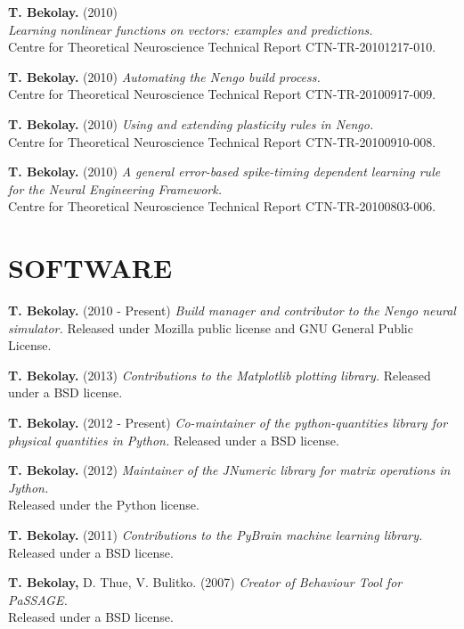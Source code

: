 \documentclass[line,margin]{res}
\begin{document}
\begin{resume}
\textbf{T. Bekolay.} (2010) \\
  {\sl Learning nonlinear functions on vectors: examples and predictions.} \\
  Centre for Theoretical Neuroscience Technical Report CTN-TR-20101217-010.

\textbf{T. Bekolay.} (2010)
  {\sl Automating the Nengo build process.} \\
  Centre for Theoretical Neuroscience Technical Report CTN-TR-20100917-009.

\textbf{T. Bekolay.} (2010)
  {\sl Using and extending plasticity rules in Nengo.} \\
  Centre for Theoretical Neuroscience Technical Report CTN-TR-20100910-008.

\textbf{T. Bekolay.} (2010)
  {\sl A general error-based spike-timing dependent learning rule for
  the Neural Engineering Framework.} \\
  Centre for Theoretical Neuroscience Technical Report CTN-TR-20100803-006.

\section{SOFTWARE}

\textbf{T. Bekolay.} (2010 - Present)
  {\sl Build manager and contributor to the Nengo neural simulator.}
  Released under Mozilla public license and GNU General Public License.

\textbf{T. Bekolay.} (2013)
  {\sl Contributions to the Matplotlib plotting library.}
  Released under a BSD license.

\textbf{T. Bekolay.} (2012 - Present)
  {\sl Co-maintainer of the python-quantities library for physical quantities
  in Python.} Released under a BSD license.

\textbf{T. Bekolay.} (2012)
  {\sl Maintainer of the JNumeric library for matrix operations in Jython.} \\
  Released under the Python license.

\textbf{T. Bekolay.} (2011)
  {\sl Contributions to the PyBrain machine learning library.} \\
  Released under a BSD license.

\textbf{T. Bekolay,} D. Thue, V. Bulitko. (2007)
  {\sl Creator of Behaviour Tool for PaSSAGE.} \\
  Released under a BSD license.

\label{LastPage}
\end{resume}
\end{document}
